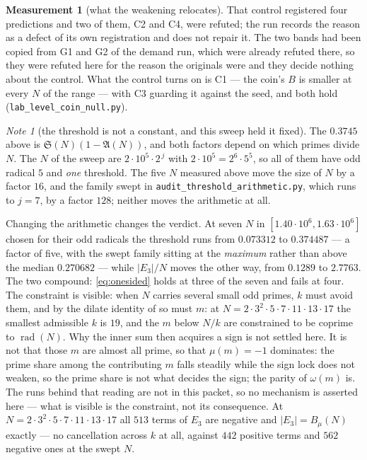 \documentclass[11pt,a4paper]{article}
\theoremstyle{plain}
\theoremstyle{definition}
\newtheorem{measurement}[theorem]{Measurement}
\theoremstyle{remark}
\newtheorem{note}[theorem]{Note}
\renewcommand{\SS}{\mathfrak{S}}
\newcommand{\AAA}{\mathfrak{A}}
\DeclareMathOperator{\rad}{rad}
\begin{document}
\begin{measurement}[what the weakening relocates]
That control registered four predictions and two of them, C2 and C4,
were refuted; the run records the reason as a defect of its own
registration and does not repair it. The two bands had been copied
from G1 and G2 of the demand run, which were already refuted there, so
they were refuted here for the reason the originals were and they
decide nothing about the control. What the control turns on is C1 ---
the coin's $B$ is smaller at every $N$ of the range --- with C3
guarding it against the seed, and both hold
(\texttt{lab\_level\_coin\_null.py}).
\end{measurement}

\begin{note}[the threshold is not a constant, and this sweep held it
fixed]\label{note:threshfam}
The $0.3745$ above is $\SS(N)(1-\AAA(N))$, and both factors depend on
which primes divide $N$. The $N$ of the sweep are
$2\cdot10^5\cdot2^{\,j}$ with $2\cdot10^5=2^6\cdot5^5$, so all of them
have odd radical $5$ and \emph{one} threshold. The five $N$ measured
above move the size of $N$ by a factor $16$, and the family swept in
\texttt{audit\_threshold\_arithmetic.py}, which runs to $j=7$, by a
factor $128$; neither moves the arithmetic at all.

Changing the arithmetic changes the verdict. At seven $N$ in
$[1.40\cdot10^6,1.63\cdot10^6]$ chosen for their odd radicals the
threshold runs from $0.073312$ to $0.374487$ --- a factor of five, with
the swept family sitting at the \emph{maximum} rather than above the
median $0.270682$ --- while $|E_3|/N$ moves the other way, from
$0.1289$ to $2.7763$. The two compound: \eqref{eq:onesided} holds at
three of the seven and fails at four. The constraint is visible: when
$N$ carries several small odd primes, $k$ must avoid them, and by the
dilate identity of \cite{P2} so must $m$: at
$N=2\cdot3^2\cdot5\cdot7\cdot11\cdot13\cdot17$ the smallest admissible
$k$ is $19$, and the $m$ below $N/k$ are constrained to be coprime to
$\rad(N)$. Why the inner sum then acquires a sign is not settled here.
It is not that those $m$ are almost all
prime, so that $\mu(m)=-1$ dominates: the prime share among the
contributing $m$ falls steadily while the sign lock does not weaken, so
the prime share is not what decides the sign; the parity of
$\omega(m)$ is. The runs behind that reading are not
in this packet, so no mechanism is asserted here --- what is visible is
the constraint, not its consequence. At
$N=2\cdot3^2\cdot5\cdot7\cdot11\cdot13\cdot17$ all $513$ terms of $E_3$
are negative and $|E_3|=B_\mu(N)$ exactly --- no cancellation across $k$ at
all, against $442$ positive terms and $562$ negative ones at the swept
$N$.


\end{note}
\end{document}
